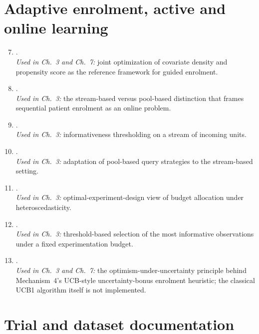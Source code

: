\section{Adaptive enrolment, active and online learning}

\begin{enumerate}\setcounter{enumi}{6}
  \item \citet{kato2024}.
    \\\textit{Used in Ch.~3 and Ch.~7:} joint optimization of covariate density
    and propensity score as the reference framework for guided enrolment.

  \item \citet{cacciarelli2023survey}.
    \\\textit{Used in Ch.~3:} the stream-based versus pool-based distinction
    that frames sequential patient enrolment as an online problem.

  \item \citet{cacciarelli2022stream}.
    \\\textit{Used in Ch.~3:} informativeness thresholding on a stream of
    incoming units.

  \item \citet{cacciarelli2022soft}.
    \\\textit{Used in Ch.~3:} adaptation of pool-based query strategies to the
    stream-based setting.

  \item \citet{fontaine2020}.
    \\\textit{Used in Ch.~3:} optimal-experiment-design view of budget
    allocation under heteroscedasticity.

  \item \citet{riquelme2016}.
    \\\textit{Used in Ch.~3:} threshold-based selection of the most informative
    observations under a fixed experimentation budget.

  \item \citet{auer2002}.
    \\\textit{Used in Ch.~3 and Ch.~7:} the optimism-under-uncertainty principle
    behind Mechanism~4's UCB-style uncertainty-bonus enrolment heuristic; the classical
    UCB1 algorithm itself is not implemented.
\end{enumerate}

\section{Trial and dataset documentation}

